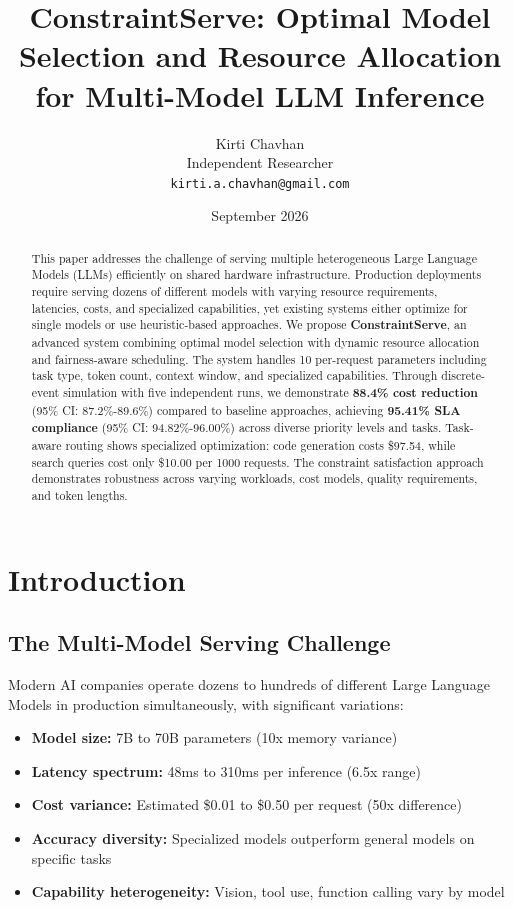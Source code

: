 \documentclass[11pt]{article}
\title{ConstraintServe: Optimal Model Selection and Resource Allocation for Multi-Model LLM Inference}
\author{Kirti Chavhan \\ Independent Researcher \\ \texttt{kirti.a.chavhan@gmail.com}}
\date{September 2026}
\begin{document}
\maketitle

\begin{abstract}
This paper addresses the challenge of serving multiple heterogeneous Large Language Models (LLMs) efficiently on shared hardware infrastructure. Production deployments require serving dozens of different models with varying resource requirements, latencies, costs, and specialized capabilities, yet existing systems either optimize for single models or use heuristic-based approaches. We propose \textbf{ConstraintServe}, an advanced system combining optimal model selection with dynamic resource allocation and fairness-aware scheduling. The system handles 10 per-request parameters including task type, token count, context window, and specialized capabilities. Through discrete-event simulation with five independent runs, we demonstrate \textbf{88.4\% cost reduction} (95\% CI: 87.2\%-89.6\%) compared to baseline approaches, achieving \textbf{95.41\% SLA compliance} (95\% CI: 94.82\%-96.00\%) across diverse priority levels and tasks. Task-aware routing shows specialized optimization: code generation costs \$97.54, while search queries cost only \$10.00 per 1000 requests. The constraint satisfaction approach demonstrates robustness across varying workloads, cost models, quality requirements, and token lengths.
\end{abstract}

\section{Introduction}

\subsection{The Multi-Model Serving Challenge}

Modern AI companies operate dozens to hundreds of different Large Language Models in production simultaneously, with significant variations:

\begin{itemize}
    \item \textbf{Model size:} 7B to 70B parameters (10x memory variance)
    \item \textbf{Latency spectrum:} 48ms to 310ms per inference (6.5x range)
    \item \textbf{Cost variance:} Estimated \$0.01 to \$0.50 per request (50x difference)
    \item \textbf{Accuracy diversity:} Specialized models outperform general models on specific tasks
    \item \textbf{Capability heterogeneity:} Vision, tool use, function calling vary by model
\end{itemize}
\end{document}
